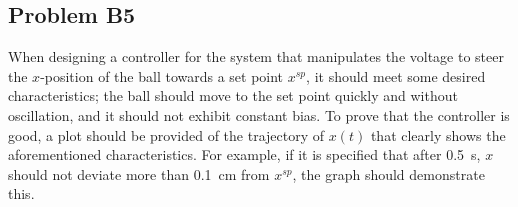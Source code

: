\documentclass[a4paper,10pt,reqno]{amsart}
\numberwithin{equation}{section}
\begin{document}
\subsection{Problem B5}\label{sec:b5}

When designing a controller for the system that manipulates the voltage to steer the $x$-position of the ball towards a set point $x^{sp}$, it should meet some desired characteristics; the ball should move to the set point quickly and without oscillation, and it should not exhibit constant bias. To prove that the controller is good, a plot should be provided of the trajectory of $x(t)$ that clearly shows the aforementioned characteristics. For example, if it is specified that after 0.5~s, $x$ should not deviate more than 0.1~cm from $x^{sp}$, the graph should demonstrate this.
\end{document}
